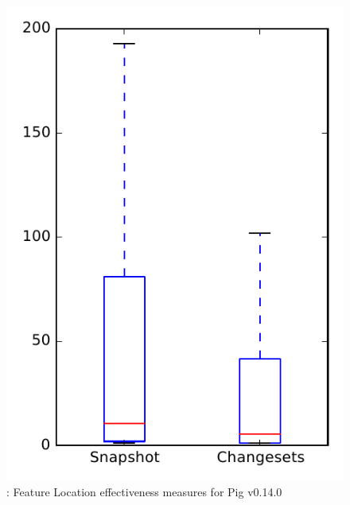 
\begin{figure}
\centering
\includegraphics[height=0.4\textheight]{figures/flt/rq1_pig_no_outlier}
\caption{\fone: Feature Location effectiveness measures for Pig v0.14.0}
\label{fig:flt:rq1:pig}
\end{figure}
